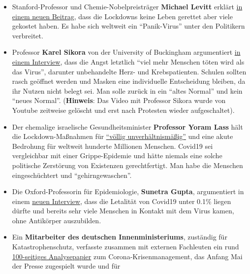 \begin{itemize}
{  Gefahr darstelle}. Die meisten Menschen würden nicht oder nur mild
  daran erkranken und selbst bei jenen, die stark erkranken, seien die
  Heilungschancen gut.
\item
  Stanford-Professor und Chemie-Nobelpreisträger \textbf{Michael Levitt}
  erklärt
  \href{https://www.telegraph.co.uk/news/2020/05/23/lockdown-saved-no-lives-may-have-cost-nobel-prize-winner-believes/}{in
  einem neuen Beitrag}, dass die Lockdowns keine Leben gerettet aber
  viele gekostet haben. Es habe sich weltweit ein ``Panik-Virus'' unter
  den Politikern verbreitet.
\item
  Professor \textbf{Karel Sikora} von der University of Buckingham
  argumentiert \href{https://www.youtube.com/watch?v=uk2YZfnsOPg}{in
  einem Interview}, dass die Angst letztlich ``viel mehr Menschen töten
  wird als das Virus'', darunter unbehandelte Herz- und Krebspatienten.
  Schulen sollten rasch geöffnet werden und Masken eine individuelle
  Entscheidung bleiben, da ihr Nutzen nicht belegt sei. Man solle zurück
  in ein ``altes Normal'' und kein ``neues Normal''. (\textbf{Hinweis}:
  Das Video mit Professor Sikora wurde von Youtube zeitweise gelöscht
  und erst nach Protesten wieder aufgeschaltet).\\
\item
  Der ehemalige israelische Gesundheitsminister \textbf{Professor Yoram
  Lass} hält die Lockdown-Maßnahmen für
  \href{https://www.spiked-online.com/2020/05/22/nothing-can-justify-this-destruction-of-peoples-lives/}{``völlig
  unverhältnismäßig''} und eine akute Bedrohung für weltweit hunderte
  Millionen Menschen. Covid19 sei vergleichbar mit einer Grippe-Epidemie
  und hätte niemals eine solche politische Zerstörung von Existenzen
  gerechtfertigt. Man habe die Menschen eingeschüchtert und
  ``gehirngewaschen''.
\item
  Die Oxford-Professorin für Epidemiologie, \textbf{Sunetra Gupta},
  argumentiert in einem
  \href{https://unherd.com/2020/05/oxford-doubles-down-sunetra-gupta-interview/}{neuen
  Interview}, dass die Letalität von Covid19 unter 0.1\% liegen dürfte
  und bereits sehr viele Menschen in Kontakt mit dem Virus kamen, ohne
  Antikörper auszubilden.
\item
  Ein \textbf{Mitarbeiter des deutschen Innenministeriums}, zuständig
  für Katastrophenschutz, verfasste zusammen mit externen Fachleuten ein
  rund
  \href{https://www.ichbinanderermeinung.de/Dokument93.pdf}{100-seitiges
  Analysepapier} zum Corona-Krisenmanagement, das Anfang Mai der Presse
  zugespielt wurde und für

\end{itemize}
